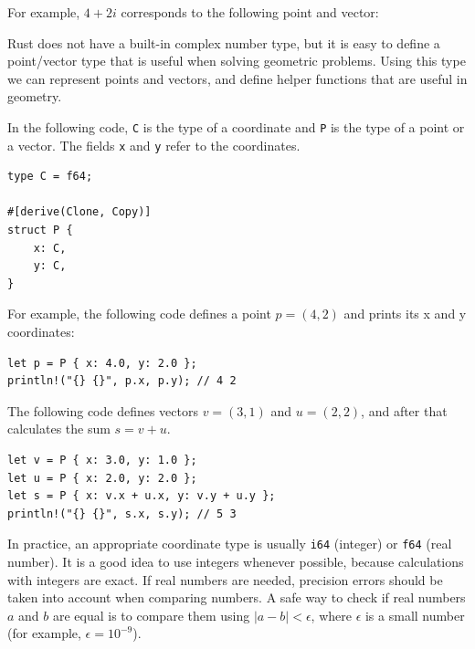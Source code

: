 For example, $4+2i$ corresponds to the
following point and vector:

\begin{center}
\end{center}


Rust does not have a built-in complex number type,
but it is easy to define a point/vector type
that is useful when solving geometric problems.
Using this type we can represent points and vectors,
and define helper functions that are useful in geometry.

In the following code, \texttt{C} is the type of
a coordinate and \texttt{P} is the type of a point or a vector.
The fields \texttt{x} and \texttt{y} refer to the coordinates.

\begin{lstlisting}
type C = f64;

#[derive(Clone, Copy)]
struct P {
    x: C,
    y: C,
}
\end{lstlisting}

For example, the following code defines a point $p=(4,2)$
and prints its x and y coordinates:

\begin{lstlisting}
let p = P { x: 4.0, y: 2.0 };
println!("{} {}", p.x, p.y); // 4 2
\end{lstlisting}

The following code defines vectors $v=(3,1)$ and $u=(2,2)$,
and after that calculates the sum $s=v+u$.

\begin{lstlisting}
let v = P { x: 3.0, y: 1.0 };
let u = P { x: 2.0, y: 2.0 };
let s = P { x: v.x + u.x, y: v.y + u.y };
println!("{} {}", s.x, s.y); // 5 3
\end{lstlisting}

In practice,
an appropriate coordinate type is usually
\texttt{i64} (integer) or \texttt{f64} (real number).
It is a good idea to use integers whenever possible,
because calculations with integers are exact.
If real numbers are needed,
precision errors should be taken into account
when comparing numbers.
A safe way to check if real numbers $a$ and $b$ are equal
is to compare them using $|a-b|<\epsilon$,
where $\epsilon$ is a small number (for example, $\epsilon=10^{-9}$).

